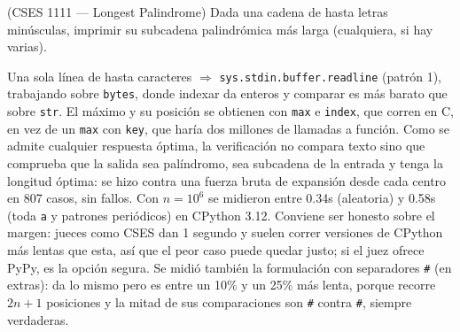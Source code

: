 
(CSES 1111 — Longest Palindrome) Dada una cadena de hasta  letras minúsculas, imprimir su subcadena palindrómica más larga (cualquiera, si hay varias).

 Una sola línea de hasta  caracteres $\Rightarrow$ \texttt{sys.stdin.buffer.readline} (patrón 1), trabajando sobre \texttt{bytes}, donde indexar da enteros y comparar es más barato que sobre \texttt{str}. El máximo y su posición se obtienen con \texttt{max} e \texttt{index}, que corren en C, en vez de un \texttt{max} con \texttt{key}, que haría dos millones de llamadas a función. Como se admite cualquier respuesta óptima, la verificación no compara texto sino que comprueba que la salida sea palíndromo, sea subcadena de la entrada y tenga la longitud óptima: se hizo contra una fuerza bruta de expansión desde cada centro en 807 casos, sin fallos. Con $n = 10^6$ se midieron entre \aprox{}0.34s (aleatoria) y \aprox{}0.58s (toda \texttt{a} y patrones periódicos) en CPython 3.12. Conviene ser honesto sobre el margen: jueces como CSES dan 1 segundo y suelen correr versiones de CPython más lentas que esta, así que el peor caso puede quedar justo; si el juez ofrece PyPy, es la opción segura. Se midió también la formulación con separadores \texttt{\#} (en extras): da lo mismo pero es entre un 10\% y un 25\% más lenta, porque recorre $2n+1$ posiciones y la mitad de sus comparaciones son \texttt{\#} contra \texttt{\#}, siempre verdaderas.


